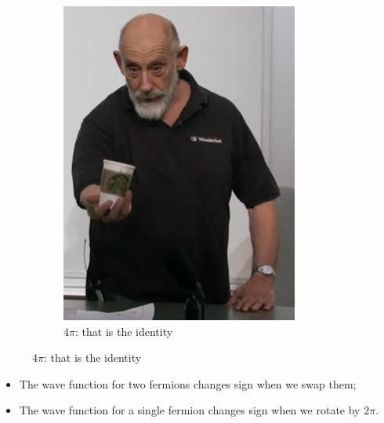 \documentclass[]{article}
\begin{document}
\begin{figure}[H]
\begin{subfigure}{0.45\textwidth}
	\end{subfigure}
	\begin{subfigure}{0.45\textwidth}
		\caption{$4\pi$: that is the identity}
		\includegraphics[width=\textwidth]{aqm-5-coffee-cup4}
	\end{subfigure}
\end{figure}

\begin{itemize}
	\item The wave function for two fermions changes sign when we swap them;
	\item The wave function for a single fermion changes sign when we rotate by $2\pi$.
\end{itemize}
\end{document}
